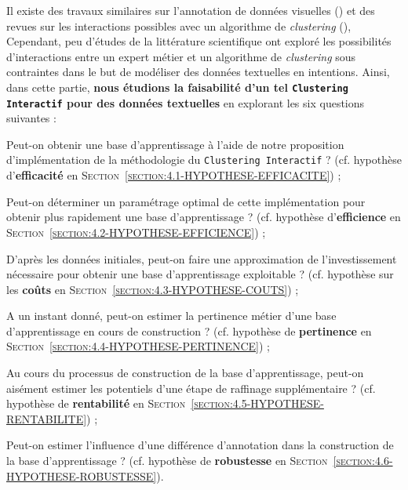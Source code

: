 	Il existe des travaux similaires sur l'annotation de données visuelles (\cite{lampert-etal:2019:constrained-distance-based}) et des revues sur les interactions possibles avec un algorithme de \textit{clustering} (\cite{bae-etal:2021:interactive-clustering-comprehensive}),
	Cependant, peu d'études de la littérature scientifique ont exploré les possibilités d'interactions entre un expert métier et un algorithme de \textit{clustering} sous contraintes dans le but de modéliser des données textuelles en intentions.
	Ainsi, dans cette partie, \textbf{nous étudions la faisabilité d'un tel \texttt{Clustering Interactif} pour des données textuelles} en explorant les six questions suivantes :
	\begin{leftBarImportantRed}
		\begin{todolist}
			\item Peut-on obtenir une base d'apprentissage à l'aide de notre proposition d'implémentation de la méthodologie du \texttt{Clustering Interactif} ? (cf. hypothèse d'\textbf{efficacité} en \textsc{Section~\ref{section:4.1-HYPOTHESE-EFFICACITE}}) ;
			\item Peut-on déterminer un paramétrage optimal de cette implémentation pour obtenir plus rapidement une base d'apprentissage ? (cf. hypothèse d'\textbf{efficience} en \textsc{Section~\ref{section:4.2-HYPOTHESE-EFFICIENCE}}) ;
			\item D'après les données initiales, peut-on faire une approximation de l'investissement nécessaire pour obtenir une base d'apprentissage exploitable ? (cf. hypothèse sur les \textbf{coûts} en \textsc{Section~\ref{section:4.3-HYPOTHESE-COUTS}}) ;
			\item A un instant donné, peut-on estimer la pertinence métier d'une base d'apprentissage en cours de construction ? (cf. hypothèse de \textbf{pertinence} en \textsc{Section~\ref{section:4.4-HYPOTHESE-PERTINENCE}}) ;
			\item Au cours du processus de construction de la base d'apprentissage, peut-on aisément estimer les potentiels d'une étape de raffinage supplémentaire ? (cf. hypothèse de \textbf{rentabilité} en \textsc{Section~\ref{section:4.5-HYPOTHESE-RENTABILITE}}) ;
			\item Peut-on estimer l'influence d'une différence d'annotation dans la construction de la base d'apprentissage ? (cf. hypothèse de \textbf{robustesse} en \textsc{Section~\ref{section:4.6-HYPOTHESE-ROBUSTESSE}}).
		\end{todolist}
	\end{leftBarImportantRed}
	
